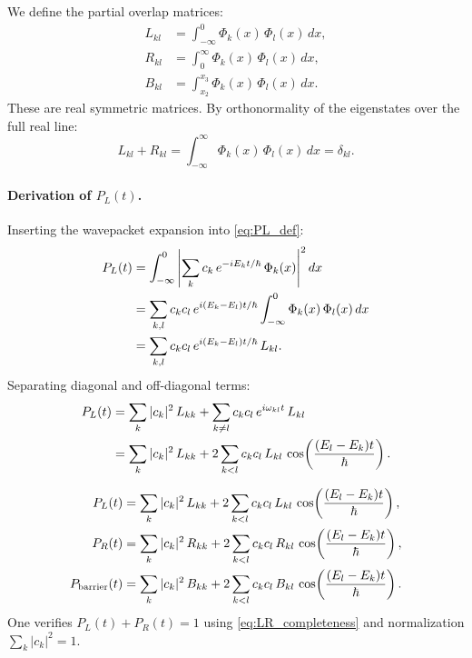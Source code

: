 We define the partial overlap matrices:
\begin{align}
  L_{kl} &= \int_{-\infty}^{0} \Phi_k(x)\,\Phi_l(x)\,dx,\label{eq:Lkl}\\
  R_{kl} &= \int_{0}^{\infty} \Phi_k(x)\,\Phi_l(x)\,dx,\label{eq:Rkl}\\
  B_{kl} &= \int_{x_2}^{x_3} \Phi_k(x)\,\Phi_l(x)\,dx.\label{eq:Bkl}
\end{align}
These are real symmetric matrices.
By orthonormality of the eigenstates over the full real line:
\begin{equation}\label{eq:LR_completeness}
  L_{kl} + R_{kl} = \int_{-\infty}^{\infty} \Phi_k(x)\,\Phi_l(x)\,dx = \delta_{kl}.
\end{equation}

\paragraph{Derivation of $P_L(t)$.}

Inserting the wavepacket expansion into \cref{eq:PL_def}:
\begin{align}
  P_L(t)
  &= \int_{-\infty}^{0} \left|\sum_k c_k\,e^{-iE_k t/\hbar}\,\Phi_k(x)\right|^2 dx\notag\\
  &= \sum_{k,l} c_k c_l\,e^{i(E_k - E_l)t/\hbar}\int_{-\infty}^{0} \Phi_k(x)\,\Phi_l(x)\,dx\notag\\
  &= \sum_{k,l} c_k c_l\,e^{i(E_k - E_l)t/\hbar}\,L_{kl}.
\end{align}
Separating diagonal and off-diagonal terms:
\begin{align}
  P_L(t)
  &= \sum_k |c_k|^2\,L_{kk}
  + \sum_{k \neq l} c_k c_l\,e^{i\omega_{kl}t}\,L_{kl}\notag\\
  &= \sum_k |c_k|^2\,L_{kk}
  + 2\sum_{k<l} c_k c_l\,L_{kl}\,\cos\!\left(\frac{(E_l - E_k)t}{\hbar}\right).
\end{align}

\begin{result}\label{res:well_occ}
\begin{align}
  P_L(t) &= \sum_k |c_k|^2\,L_{kk}
  + 2\sum_{k<l} c_k c_l\,L_{kl}\,\cos\!\left(\frac{(E_l - E_k)t}{\hbar}\right),\label{eq:PL}\\
  P_R(t) &= \sum_k |c_k|^2\,R_{kk}
  + 2\sum_{k<l} c_k c_l\,R_{kl}\,\cos\!\left(\frac{(E_l - E_k)t}{\hbar}\right),\label{eq:PR_occ}\\
  P_{\text{barrier}}(t) &= \sum_k |c_k|^2\,B_{kk}
  + 2\sum_{k<l} c_k c_l\,B_{kl}\,\cos\!\left(\frac{(E_l - E_k)t}{\hbar}\right).\label{eq:Pbarrier}
\end{align}
One verifies $P_L(t) + P_R(t) = 1$ using \cref{eq:LR_completeness} and normalization $\sum_k |c_k|^2 = 1$.
\end{result}

